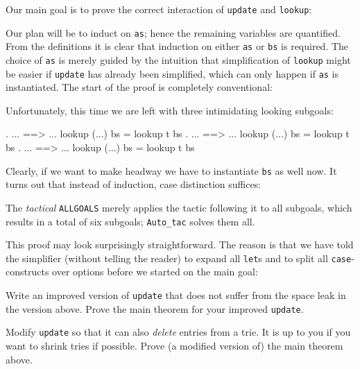 Our main goal is to prove the correct interaction of \texttt{update} and
\texttt{lookup}:
\begin{quote}\small

\end{quote}
Our plan will be to induct on \texttt{as}; hence the remaining variables are
quantified. From the definitions it is clear that induction on either
\texttt{as} or \texttt{bs} is required. The choice of \texttt{as} is merely
guided by the intuition that simplification of \texttt{lookup} might be easier
if \texttt{update} has already been simplified, which can only happen if
\texttt{as} is instantiated.
The start of the proof is completely conventional:
\begin{ttbox}
\end{ttbox}
Unfortunately, this time we are left with three intimidating looking subgoals:
\begin{ttbox}
{. ... ==> ... lookup (...) bs = lookup t bs}
{. ... ==> ... lookup (...) bs = lookup t bs}
{. ... ==> ... lookup (...) bs = lookup t bs}
\end{ttbox}
Clearly, if we want to make headway we have to instantiate \texttt{bs} as
well now. It turns out that instead of induction, case distinction
suffices:
\begin{ttbox}
\end{ttbox}
The {\em tactical} \texttt{ALLGOALS} merely applies the tactic following it
to all subgoals, which results in a total of six subgoals; \texttt{Auto_tac}
solves them all.

This proof may look surprisingly straightforward. The reason is that we
have told the simplifier (without telling the reader) to expand all
\texttt{let}s and to split all \texttt{case}-constructs over options before
we started on the main goal:
\begin{ttbox}
\end{ttbox}

\begin{exercise}
  Write an improved version of \texttt{update} that does not suffer from the
  space leak in the version above. Prove the main theorem for your improved
  \texttt{update}.
\end{exercise}

\begin{exercise}
  Modify \texttt{update} so that it can also {\em delete} entries from a
  trie. It is up to you if you want to shrink tries if possible. Prove (a
  modified version of) the main theorem above.
\end{exercise}

